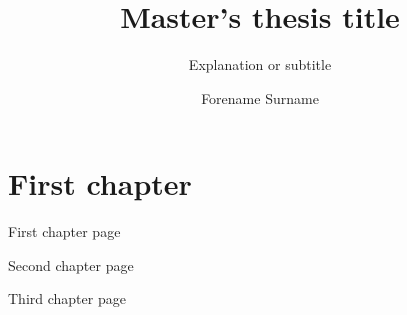 \documentclass[noprint,nocopyright]{uit-thesis-test}
\begin{document}
\title{Master's thesis title}
\subtitle{Explanation or subtitle}
\author{Forename Surname}

\maketitle

\frontmatter

\tableofcontents

\mainmatter

\chapter{First chapter}

First chapter page

\newpage

Second chapter page

\newpage

Third chapter page
\end{document}
